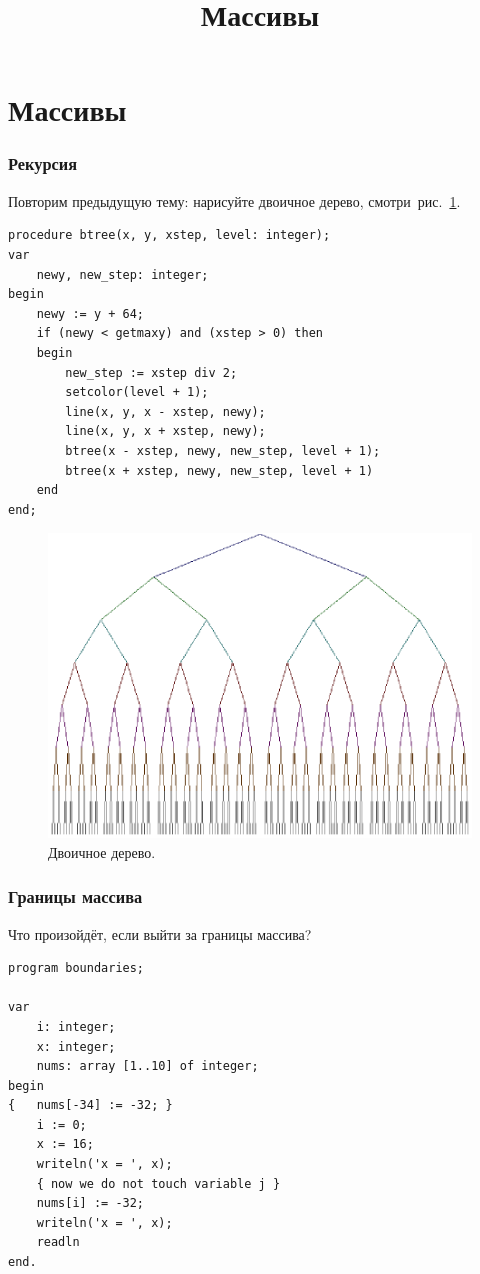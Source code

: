 \documentclass[10,a4paper]{article}
\title{Массивы}
\begin{document}
\section{Массивы}
\subsubsection{Рекурсия}
Повторим предыдущую тему: нарисуйте двоичное дерево,
смотри~рис.~\ref{fig:btree}.
\begin{lstlisting}
procedure btree(x, y, xstep, level: integer);
var
    newy, new_step: integer;
begin
    newy := y + 64;
    if (newy < getmaxy) and (xstep > 0) then
    begin
        new_step := xstep div 2;
        setcolor(level + 1);
        line(x, y, x - xstep, newy);
        line(x, y, x + xstep, newy);
        btree(x - xstep, newy, new_step, level + 1);
        btree(x + xstep, newy, new_step, level + 1)
    end
end;
\end{lstlisting}
\begin{figure}[!ht]
    \begin{centering}
        \includegraphics{btree}
        \caption{Двоичное дерево.}
        \label{fig:btree}
    \end{centering}
\end{figure}
\subsubsection{Границы массива}
Что произойдёт, если выйти за границы массива?
\begin{lstlisting}
program boundaries;

var
    i: integer;
    x: integer;
    nums: array [1..10] of integer;
begin
{   nums[-34] := -32; }
    i := 0;
    x := 16;
    writeln('x = ', x);
    { now we do not touch variable j }
    nums[i] := -32;
    writeln('x = ', x);
    readln
end.
\end{lstlisting}
\end{document}
